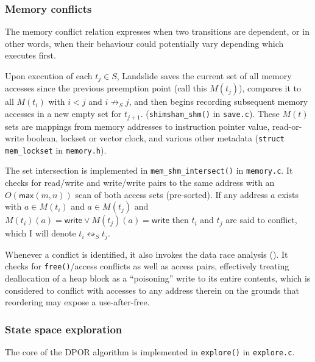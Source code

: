 \subsubsection{Memory conflicts}

The memory conflict relation expresses when two transitions are dependent,
or in other words, when their behaviour could potentially vary depending which executes first.

Upon execution of each $t_j \in S$,
Landslide saves the current set of all memory accesses since the previous preemption point (call this $M(t_j)$),
compares it to all $M(t_i)$ with $i < j$ and $i \not\rightarrow_S j$,
and then begins recording subsequent memory accesses in a new empty set for $t_{j+1}$.
({\tt shimsham\_shm()} in {\tt save.c}).
These $M(t)$ sets are mappings from memory addresses to
instruction pointer value, read-or-write boolean, lockset or vector clock, and various other metadata
({\tt struct mem\_lockset} in {\tt memory.h}).

The set intersection is implemented in {\tt mem\_shm\_intersect()} in {\tt memory.c}.
It checks for read/write and write/write pairs to the same address with an $O(\mathsf{max}(m,n))$ scan of both access sets (pre-sorted).
If any address $a$ exists with $a \in M(t_i)$ and $a \in M(t_j)$ and $M(t_i)(a) = \mathsf{write} \vee M(t_j)(a) = \mathsf{write}$
then $t_i$ and $t_j$ are said to conflict,
which I will denote $t_i \leftrightsquigarrow_S t_j$.

Whenever a conflict is identified, it also invokes the data race analysis (\sect{\ref{sec:landslide-datarace}}).
It checks for {\tt free()}/access conflicts as well as access pairs,
effectively treating deallocation of a heap block as a ``poisoning'' write to its entire contents,
which is considered to conflict with accesses to any address therein
on the grounds that reordering may expose a use-after-free.

\subsubsection{State space exploration}
\label{sec:landslide-explore}

The core of the DPOR algorithm is implemented in {\tt explore()} in {\tt explore.c}.

